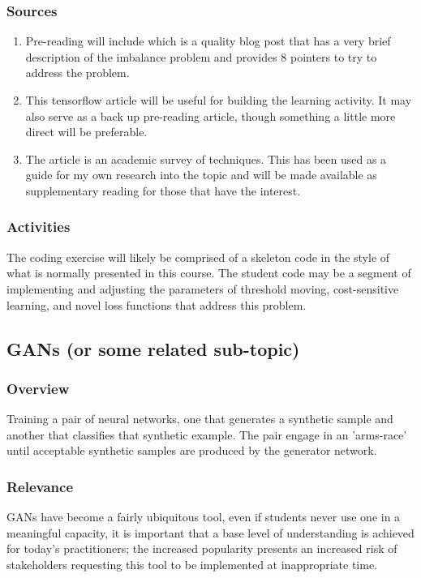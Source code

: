 \documentclass[12pt]{amsart}
\begin{document}
\subsubsection{Sources}
\begin{enumerate}
	\item Pre-reading will include\cite{Brownlee_2015} which is a quality blog post that has a very brief 
	description of the imbalance problem and provides 8 pointers to try to address the problem.
	\item This \cite{tf-imbalanced} tensorflow article will be useful for building the learning
	activity. It may also serve as a back up pre-reading article, though something a little 
	more direct will be preferable.
	\item The \cite{Johnson_2019} article is an academic survey of techniques. 
	This has been used as a guide for my own research into the topic and will be made available
	as supplementary reading for those that have the interest.
\end{enumerate}

\subsubsection{Activities}
The coding exercise will likely be comprised of a skeleton code in the style of what 
is normally presented in this course.
The student code may be a segment of implementing and adjusting the parameters 
of threshold moving, cost-sensitive learning, and novel loss functions that address this problem.



\subsection{GANs (or some related sub-topic)}
\subsubsection{Overview}
Training a pair of neural networks, one that generates a synthetic sample and another that classifies
that synthetic example. The pair engage in an 'arms-race' until acceptable synthetic samples are
produced by the generator network.

\subsubsection{Relevance}
GANs have become a fairly ubiquitous tool, even if students never use one in a meaningful capacity,
it is important that a base level of understanding is achieved for today's practitioners;
the increased popularity presents an increased risk of stakeholders requesting this tool to be
implemented at inappropriate time.
\end{document}
